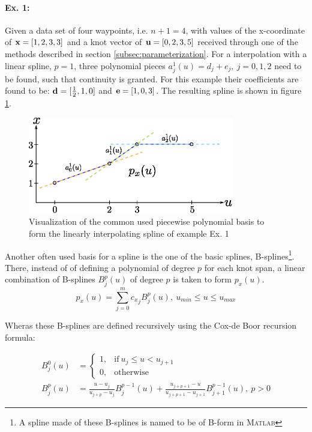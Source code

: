 \paragraph{Ex. 1:}
Given a data set of four waypoints, i.e. $n+1=4$, with values of the x-coordinate of ${\bf x} = [1,2,3,3]$ and a knot vector of ${\bf u}=[0,2,3,5]$ received through one of the methods described in section \ref{subsec:parameterization}. For a interpolation with a linear spline, $p=1$, three polynomial pieces $a_j^1(u)=d_j+e_j,~j=0,1,2$ need to be found, such that continuity is granted. For this example their coefficients are found to be: ${\bf d}=[\frac{1}{2},1,0]$ and ${\bf e}=[1,0,3]$. The resulting spline is shown in figure \ref{fig:ppSpline}.

\begin{figure}[H]
	\centering
    \includegraphics[width = 0.8\textwidth]{graphics/ppSpline.eps}
  \caption{Visualization of the common used piecewise polynomial basis to form the linearly interpolating spline of example Ex. 1}
  \label{fig:ppSpline}
\end{figure} 


Another often used basis for a spline is the one of the basic splines, B-splines\footnote{A spline made of these B-splines is named to be of B-form in \textsc{Matlab}}. There, instead of of defining a polynomial of degree $p$ for each knot span, a linear combination of B-splines $B_j^p(u)$ of degree $p$ is taken to form $p_x(u)$.
\begin{equation}
p_x(u) = \sum_{j=0}^m {c_x}_jB_j^p(u), ~u_{min} \leq u \leq u_{max}
\end{equation}

 Wheras these B-splines are defined recursively using the Cox-de Boor recursion formula:
 
 \begin{align}
B_j^0(u) &= \begin{cases} 1,&\text{if}~ u_j \leq u < u_{j+1}\\
					0,&\text{otherwise}
		\end{cases}\\
B_j^p(u) &= \frac{u-u_j}{u_{j+p}-u_j}B_j^{p-1}(u)+\frac{u_{j+p+1}-u}{u_{j+p+1}-u_{j+1}}B_{j+1}^{p-1}(u), ~p>0
\end{align}

